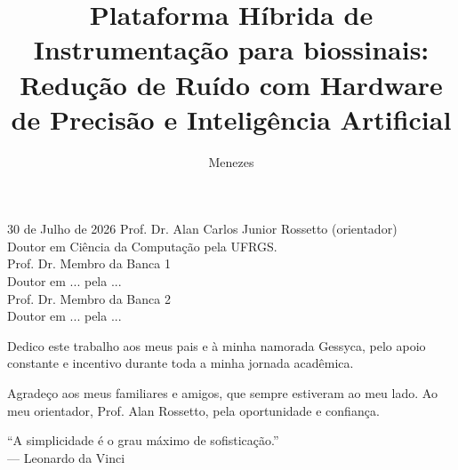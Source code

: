 \documentclass[tcc,capa]{texufpel}
\title{Plataforma Híbrida de Instrumentação para biossinais: Redução de Ruído com Hardware de Precisão e Inteligência Artificial}
\author{Menezes}{Gerson Leite de}
\begin{document}
\maketitle 

\sloppy

\fichacatalografica

\begin{aprovacao}{30 de Julho de 2026} 
\noindent Prof. Dr. Alan Carlos Junior Rossetto (orientador)\\
Doutor em Ciência da Computação pela UFRGS.\\[1cm]

\noindent Prof. Dr. Membro da Banca 1\\
Doutor em ... pela ...\\[1cm]

\noindent Prof. Dr. Membro da Banca 2\\
Doutor em ... pela ...\\[1cm]
\end{aprovacao}

\begin{dedicatoria}
  Dedico este trabalho aos meus pais e à minha namorada Gessyca, pelo apoio constante e incentivo durante toda a minha jornada acadêmica.
\end{dedicatoria}

\begin{agradecimentos}
  Agradeço aos meus familiares e amigos, que sempre estiveram ao meu lado.
  Ao meu orientador, Prof. Alan Rossetto, pela oportunidade e confiança.
\end{agradecimentos}

\begin{epigrafe}
  ``A simplicidade é o grau máximo de sofisticação.''\\
  {\sc --- Leonardo da Vinci}
\end{epigrafe}
\end{document}
